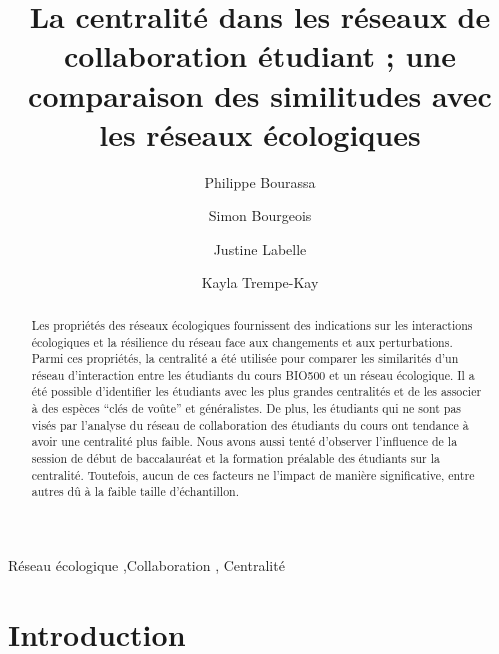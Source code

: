 \documentclass[preprint, 3p,
authoryear]{elsarticle} %
\begin{document}
\begin{frontmatter}

  \title{La centralité dans les réseaux de collaboration étudiant ; une
comparaison des similitudes avec les réseaux écologiques}
    \author[a]{Philippe Bourassa%
  }
    \author[a]{Simon Bourgeois%
  }
    \author[a]{Justine Labelle%
  }
    \author[a]{Kayla Trempe-Kay%
  }
  
  \begin{abstract}
  Les propriétés des réseaux écologiques fournissent des indications sur
  les interactions écologiques et la résilience du réseau face aux
  changements et aux perturbations. Parmi ces propriétés, la centralité
  a été utilisée pour comparer les similarités d'un réseau d'interaction
  entre les étudiants du cours BIO500 et un réseau écologique. Il a été
  possible d'identifier les étudiants avec les plus grandes centralités
  et de les associer à des espèces ``clés de voûte'' et généralistes. De
  plus, les étudiants qui ne sont pas visés par l'analyse du réseau de
  collaboration des étudiants du cours ont tendance à avoir une
  centralité plus faible. Nous avons aussi tenté d'observer l'influence
  de la session de début de baccalauréat et la formation préalable des
  étudiants sur la centralité. Toutefois, aucun de ces facteurs ne
  l'impact de manière significative, entre autres dû à la faible taille
  d'échantillon.
  \end{abstract}
    \begin{keyword}
    Réseau écologique \sep Collaboration \sep 
    Centralité
  \end{keyword}
  
 \end{frontmatter}

\hypertarget{introduction}{%
\section{Introduction}\label{introduction}}
\end{document}
